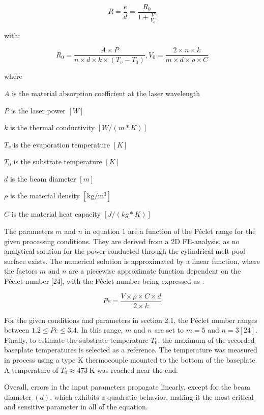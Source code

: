 \documentclass[10pt]{article}
\begin{document}
\begin{equation*}
R=\frac{e}{d}=\frac{R_{0}}{1+\frac{V}{V_{0}}} \tag{1}
\end{equation*}


with:

$$
R_{0}=\frac{A \times P}{n \times d \times k \times\left(T_{v}-T_{0}\right)}, V_{0}=\frac{2 \times n \times k}{m \times d \times \rho \times C}
$$

where

$A$ is the material absorption coefficient at the laser wavelength

$P$ is the laser power $[W]$

$k$ is the thermal conductivity $[W /(m * K)]$

$T_{v}$ is the evaporation temperature $[K]$

$T_{0}$ is the substrate temperature $[K]$

$d$ is the beam diameter $[m]$

$\rho$ is the material density $\left[\mathrm{kg} / \mathrm{m}^{3}\right]$

$C$ is the material heat capacity $[J /(k g * K)]$

The parameters $m$ and $n$ in equation 1 are a function of the Péclet range for the given processing conditions. They are derived from a 2D FE-analysis, as no analytical solution for the power conducted through the cylindrical melt-pool surface exists. The numerical solution is approximated by a linear function, where the factors $m$ and $n$ are a piecewise approximate function dependent on the Péclet number [24], with the Péclet number being expressed as :


\begin{equation*}
P e=\frac{V \times \rho \times C \times d}{2 \times k} \tag{2}
\end{equation*}


For the given conditions and parameters in section 2.1, the Péclet number ranges between $1.2 \leq P e \leq 3.4$. In this range, $m$ and $n$ are set to $m=5$ and $n=3[24]$. Finally, to estimate the substrate temperature $T_{0}$, the maximum of the recorded baseplate temperatures is selected as a reference. The temperature was measured in process using a type $\mathrm{K}$ thermocouple mounted to the bottom of the baseplate. A temperature of $T_{0} \approx 473 \mathrm{~K}$ was reached near the end.

Overall, errors in the input parameters propagate linearly, except for the beam diameter $(d)$, which exhibits a quadratic behavior, making it the most critical and sensitive parameter in all of the equation.
\end{document}
